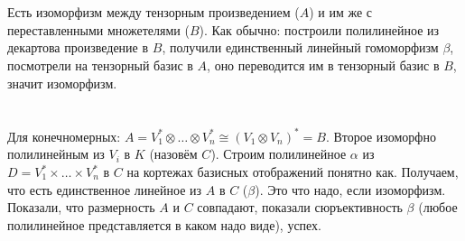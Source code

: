 \section{} %
Есть изоморфизм между тензорным произведением ($A$) и им же с переставленными множетелями ($B$).
Как обычно: построили полилинейное из декартова произведение в $B$, получили единственный линейный
гомоморфизм $\beta$, посмотрели на тензорный базис в $A$, оно переводится им в тензорный базис в $B$,
значит изоморфизм.

\section{} %
Для конечномерных: $A=V_1^* \otimes \dots \otimes V_n^* \cong (V_1 \otimes V_n)^*=B$.
Второе изоморфно полилинейным из $V_i$ в $K$ (назовём $C$).
Строим полилинейное $\alpha$ из $D=V_1^* \times \dots \times V_n^*$ в $C$ на кортежах базисных отображений понятно как.
Получаем, что есть единственное линейное из $A$ в $C$ ($\beta$).
Это что надо, если изоморфизм.
Показали, что размерность $A$ и $C$ совпадают, показали сюръективность $\beta$ (любое полилинейное
представляется в каком надо виде), успех.

\section{} %
